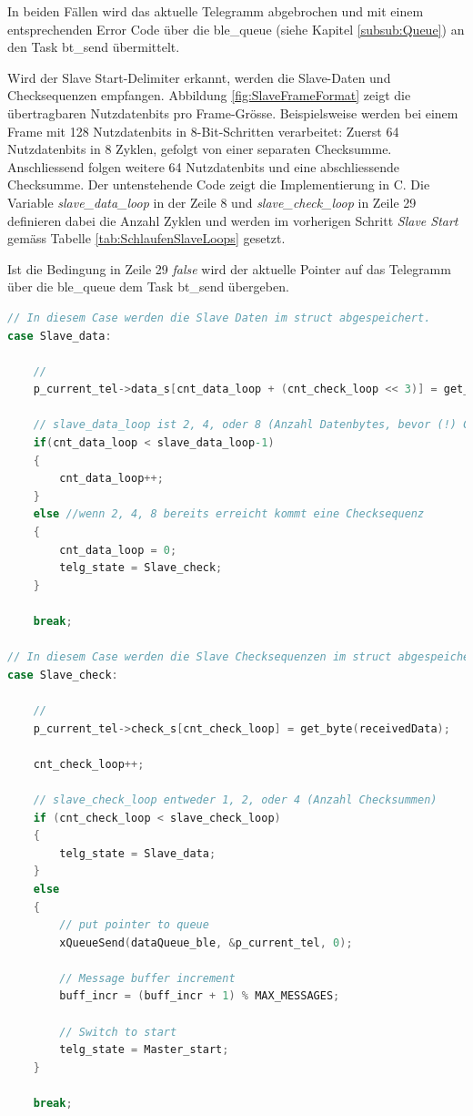 In beiden Fällen wird das aktuelle Telegramm abgebrochen und mit einem entsprechenden Error Code über die ble\_queue (siehe Kapitel \ref{subsub:Queue}) an den Task bt\_send übermittelt. 

Wird der Slave Start-Delimiter erkannt, werden die Slave-Daten und Checksequenzen empfangen. Abbildung \ref{fig:SlaveFrameFormat} zeigt die übertragbaren Nutzdatenbits pro Frame-Grösse. Beispielsweise werden bei einem Frame mit 128 Nutzdatenbits in 8-Bit-Schritten verarbeitet: Zuerst 64 Nutzdatenbits in 8 Zyklen, gefolgt von einer separaten Checksumme. Anschliessend folgen weitere 64 Nutzdatenbits und eine abschliessende Checksumme. Der untenstehende Code zeigt die Implementierung in C. Die Variable \textit{slave\_data\_loop} in der Zeile 8 und \textit{slave\_check\_loop} in Zeile 29 definieren dabei die Anzahl Zyklen und werden im vorherigen Schritt \textit{Slave Start} gemäss Tabelle \ref{tab:SchlaufenSlaveLoops} gesetzt. 

Ist die Bedingung in Zeile 29 \textit{false} wird der aktuelle Pointer auf das Telegramm über die ble\_queue dem Task bt\_send übergeben. 


\begin{lstlisting}[language=C]
// In diesem Case werden die Slave Daten im struct abgespeichert.
case Slave_data:

    // 
    p_current_tel->data_s[cnt_data_loop + (cnt_check_loop << 3)] = get_byte(receivedData);

    // slave_data_loop ist 2, 4, oder 8 (Anzahl Datenbytes, bevor (!) Checksequenz folgt
    if(cnt_data_loop < slave_data_loop-1) 
    {
        cnt_data_loop++;
    } 
    else //wenn 2, 4, 8 bereits erreicht kommt eine Checksequenz
    {
        cnt_data_loop = 0;
        telg_state = Slave_check;
    }
    
    break;

// In diesem Case werden die Slave Checksequenzen im struct abgespeichert.
case Slave_check:

    // 
    p_current_tel->check_s[cnt_check_loop] = get_byte(receivedData);

    cnt_check_loop++;

    // slave_check_loop entweder 1, 2, oder 4 (Anzahl Checksummen)
    if (cnt_check_loop < slave_check_loop)
    {
        telg_state = Slave_data;
    } 
    else 
    {
        // put pointer to queue
        xQueueSend(dataQueue_ble, &p_current_tel, 0);

        // Message buffer increment 
        buff_incr = (buff_incr + 1) % MAX_MESSAGES;

        // Switch to start 
        telg_state = Master_start;
    }

    break;
\end{lstlisting}


